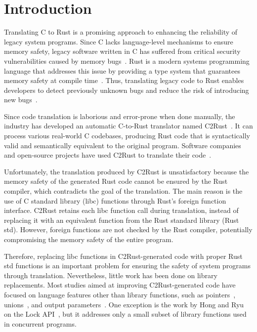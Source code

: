\section{Introduction}
\label{sec:intro}

Translating C to Rust is a promising approach to enhancing the reliability of
legacy system programs.
%
Since C lacks language-level mechanisms to ensure memory safety, legacy software
written in C has suffered from critical security vulnerabilities caused by
memory bugs~\cite{chen2011linux, msrcblog}.
%
Rust is a modern systems programming language that addresses this issue by
providing a type system that guarantees memory safety at compile
time~\cite{matsakis2014rust, jung2017rustbelt}.
%
Thus, translating legacy code to Rust enables developers to detect previously
unknown bugs and reduce the risk of introducing new bugs~\cite{rust-curl,
li2024rust}.

Since code translation is laborious and error-prone when done manually, the
industry has developed an automatic C-to-Rust translator named
C2Rust~\cite{c2rust}.
%
It can process various real-world C codebases, producing Rust code that is
syntactically valid and semantically equivalent to the original program.
%
Software companies and open-source projects have used C2Rust to translate their
code~\cite{c2rust-huawei, zebra, qcms}.

Unfortunately, the translation produced by C2Rust is unsatisfactory because the
memory safety of the generated Rust code cannot be ensured by the Rust compiler,
which contradicts the goal of the translation.
%
The main reason is the use of C standard library (libc) functions through Rust's
foreign function interface.
%
C2Rust retains each libc function call during translation, instead of replacing
it with an equivalent function from the Rust standard library (Rust std).
%
However, foreign functions are not checked by the Rust compiler, potentially
compromising the memory safety of the entire program.

Therefore, replacing libc functions in C2Rust-generated code with proper Rust
std functions is an important problem for ensuring the safety of system programs
through translation.
%
Nevertheless, little work has been done on library replacements.
%
Most studies aimed at improving C2Rust-generated code have focused on language
features other than library functions, such as
pointers~\cite{emre2021translating, emre2023aliasing, zhang2023ownership,
wu2025genc2rust}, unions~\cite{hong2024tag}, and output
parameters~\cite{hong2024dont}.
%
One exception is the work by Hong and Ryu on the Lock
API~\cite{hong2023concrat}, but it addresses only a small subset of library
functions used in concurrent programs.

